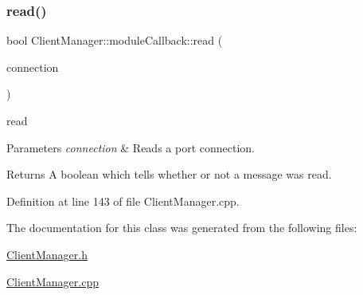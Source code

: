 \subsubsection{\texorpdfstring{read()}{read()}}
{\footnotesize\ttfamily bool Client\+Manager\+::module\+Callback\+::read (\begin{DoxyParamCaption}\item[{yarp\+::os\+::\+Connection\+Reader \&}]{connection }\end{DoxyParamCaption})\hspace{0.3cm}{\ttfamily [virtual]}}

read 
\begin{DoxyParams}{Parameters}
{\em connection} & Reads a port connection.\\
\hline
\end{DoxyParams}
\begin{DoxyReturn}{Returns}
A boolean which tells whether or not a message was read. 
\end{DoxyReturn}


Definition at line 143 of file Client\+Manager.\+cpp.



The documentation for this class was generated from the following files\+:\begin{DoxyCompactItemize}
\item 
\hyperlink{ClientManager_8h}{Client\+Manager.\+h}\item 
\hyperlink{ClientManager_8cpp}{Client\+Manager.\+cpp}\end{DoxyCompactItemize}
